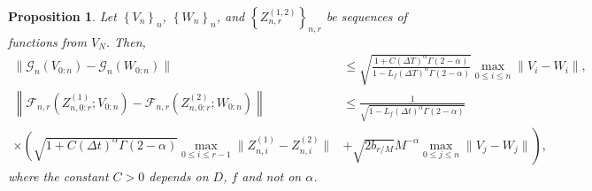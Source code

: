 \documentclass[12pt,a4paper]{article}
\newtheorem{prop}{Proposition}
\begin{document}
\begin{prop}\label{prop:Lipschitz}
	Let $\left\{V_n\right\}_n$, $\left\{W_n\right\}_n$, and $\left\{Z_{n,r}^{(1,2)}\right\}_{n,r}$ be sequences of functions from $V_N$. Then, 
	\begin{equation}
		\begin{split}
			\|\mathcal{G}_n\left(V_{0:n}\right) - \mathcal{G}_n\left(W_{0:n}\right)\| 
			&\leq \sqrt{\frac{1+C (\Delta T)^\alpha \Gamma(2-\alpha)}{1-L_f \left(\Delta T\right)^\alpha \Gamma(2-\alpha)}} \max_{0\leq i\leq n}\|V_i - W_i\|, \\
			\left\|\mathcal{F}_{n,r}\left(Z^{(1)}_{n,0:r}; V_{0:n}\right) - \mathcal{F}_{n,r}\left(Z^{(2)}_{n,0:r}; W_{0:n}\right)\right\| 
			&\leq \frac{1}{\sqrt{1-L_f (\Delta t)^\alpha \Gamma(2-\alpha)}} \\
			\times\left(\sqrt{1+ C(\Delta t)^\alpha \Gamma(2-\alpha)} \max_{0\leq i\leq r-1} \|Z^{(1)}_{n,i} - Z^{(2)}_{n,i}\| \right. & \left.+ \sqrt{2 b_{r/M}} M^{-\alpha} \max_{0\leq j\leq n} \|V_j - W_j\|\right),
		\end{split}
	\end{equation}
	where the constant $C>0$ depends on $D$, $f$ and not on $\alpha$. 
\end{prop}
\end{document}
